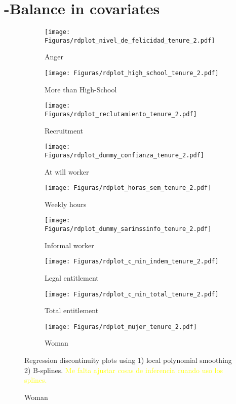 \newpage

\section{ -Balance in covariates}
\vspace{.2in}

\begin{figure}[H]
     \caption{RD plots (Calculator treatment; running variable : Tenure)}
    \label{rd_covs_tenure_t2}
\begin{center}
\begin{subfigure}{0.31\textwidth}
\caption{Anger}
        \texttt{[image: Figuras/rdplot\_nivel\_de\_felicidad\_tenure\_2.pdf]}
    \end{subfigure}
    \begin{subfigure}{0.31\textwidth}
\caption{More than High-School}
        \texttt{[image: Figuras/rdplot\_high\_school\_tenure\_2.pdf]}
    \end{subfigure}
\begin{subfigure}{0.31\textwidth}
\caption{Recruitment}
        \texttt{[image: Figuras/rdplot\_reclutamiento\_tenure\_2.pdf]}
    \end{subfigure}
    \begin{subfigure}{0.31\textwidth}
\caption{At will worker}
        \texttt{[image: Figuras/rdplot\_dummy\_confianza\_tenure\_2.pdf]}
    \end{subfigure}        
    \begin{subfigure}{0.31\textwidth}
\caption{Weekly hours}
        \texttt{[image: Figuras/rdplot\_horas\_sem\_tenure\_2.pdf]}
    \end{subfigure}    
    \begin{subfigure}{0.31\textwidth}
\caption{Informal worker}
        \texttt{[image: Figuras/rdplot\_dummy\_sarimssinfo\_tenure\_2.pdf]}
    \end{subfigure}       
\begin{subfigure}{0.31\textwidth}
\caption{Legal entitlement}
        \texttt{[image: Figuras/rdplot\_c\_min\_indem\_tenure\_2.pdf]}
    \end{subfigure}
    \begin{subfigure}{0.31\textwidth}
\caption{Total entitlement}
        \texttt{[image: Figuras/rdplot\_c\_min\_total\_tenure\_2.pdf]}
    \end{subfigure}        
\begin{subfigure}{0.31\textwidth}
\caption{Woman}
        \texttt{[image: Figuras/rdplot\_mujer\_tenure\_2.pdf]}
    \end{subfigure}
  \end{center}
  
    \scriptsize Regression discontinuity plots using 1) local polynomial smoothing 2) B-splines. \textcolor{yellow}{Me falta ajustar cosas de inferencia cuando uso los splines.}
\end{figure}




